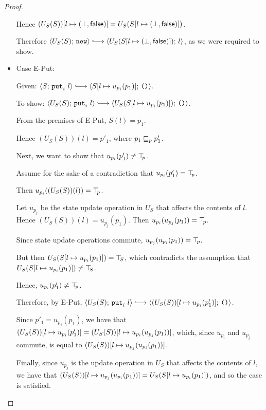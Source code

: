 \begin{proof}
\begin{itemize}
      Hence $(U_S(S))[l \mapsto (\bot, \textsf{false})] =
      U_S(S[l \mapsto (\bot, \textsf{false})])$.

      Therefore $\config{U_S(S)}{\NEW} \parstepsto
      \config{U_S(\extS{S}{l}{\bot}{\frozenfalse})}{l}$, as we were
      required to show.

    \item Case {\sc E-Put}:

      Given: $\config{S}{\putiexp{l}} \parstepsto
      \config{\extSRaw{S}{l}{u_{p_i}(p_1)}}{\unit}$.

      To show: $\config{U_S(S)}{\putiexp{l}} \parstepsto
      \config{U_S(\extSRaw{S}{l}{u_{p_i}(p_1)})}{\unit}$.

      From the premises of {\sc E-Put}, $S(l) = p_1$.

      Hence $(U_S(S))(l) = p'_1$, where $p_1 \sqsubseteq_p p'_1$.

      Next, we want to show that $u_{p_i}(p'_1) \neq \top\hspace{-0.85mm}_{p}$.

      Assume for the sake of a contradiction that $u_{p_i}(p'_1) =
      \top\hspace{-0.85mm}_{p}$.

      Then $u_{p_i}((U_S(S))(l)) = \top\hspace{-0.85mm}_{p}$.

      Let $u_{p_j}$ be the state update operation in $U_S$ that
      affects the contents of $l$.  Hence $(U_S(S))(l) =
      u_{p_j}(p_1)$. Then $u_{p_i}(u_{p_j}(p_1)) = \top\hspace{-0.85mm}_{p}$.

      Since state update operations commute, $u_{p_j}(u_{p_i}(p_1)) =
      \top\hspace{-0.85mm}_{p}$.
      
      But then $U_S(S[l \mapsto u_{p_i}(p_1)]) = \top\hspace{-0.85mm}_{S}$,
      which contradicts the assumption that
      $U_S(S[l \mapsto u_{p_i}(p_1)]) \neq \top\hspace{-0.85mm}_{S}$.

      Hence, $u_{p_i}(p'_1) \neq \top\hspace{-0.85mm}_{p}$.

      Therefore, by {\sc E-Put}, $\config{U_S(S)}{\putiexp{l}}
      \parstepsto
      \config{\extSRaw{(U_S(S))}{l}{u_{p_i}(p'_1)}}{\unit}$.

      Since $p'_1 = u_{p_j}(p_1)$, we have that
      $(U_S(S))[l \mapsto u_{p_i}(p'_1)] =
      (U_S(S))[l \mapsto u_{p_i}(u_{p_j}(p_1))]$, which, since
      $u_{p_i}$ and $u_{p_j}$ commute, is equal to
      $(U_S(S))[l \mapsto u_{p_j}(u_{p_i}(p_1))]$.

      Finally, since $u_{p_j}$ is the update operation in $U_S$ that
      affects the contents of $l$, we have that
      $(U_S(S))[l \mapsto u_{p_j}(u_{p_i}(p_1))] =
      U_S(S[l \mapsto u_{p_i}(p_1)])$, and so the case is
      satisfied.


\end{itemize}
\end{proof}

